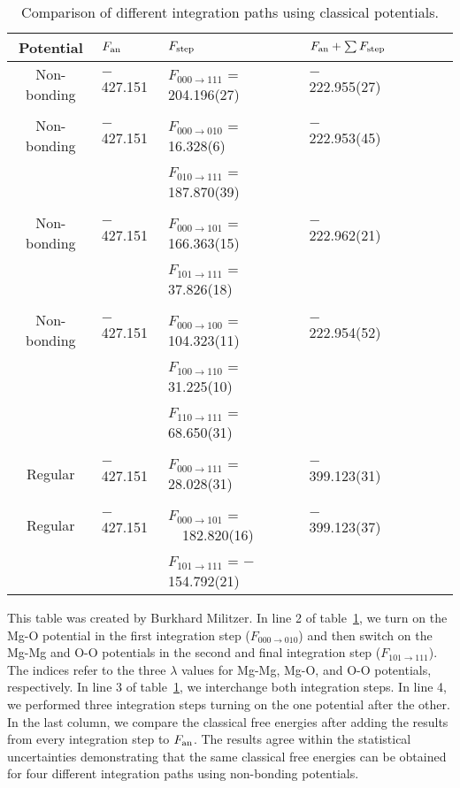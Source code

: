  \begin{table}[!h]
     \centering
\caption{Comparison of different integration paths using classical potentials. 
  \label{tab:compare_int_path}}

     \begin{tabular}{clllllll}
         \hline
{Potential} & 
            {$F_{\rm an}$} & 
            {$F_{\rm step}$} & 
            {$F_{\rm an} + \sum F_{\rm step}$} \\
         \hline
Non-bonding & $-$427.151 & $F_{000 \to 111}$ = 204.196(27)      & $-$222.955(27)
\\[1mm]\hline\\[-2.5mm]
Non-bonding & $-$427.151 & $F_{000 \to 010}$ = $\,\:$16.328(6)  & $-$222.953(45)\\
           &          & $F_{010 \to 111}$ = 187.870(39) 
\\[1mm]\hline\\[-2.5mm]
Non-bonding & $-$427.151 & $F_{000 \to 101}$ = 166.363(15)      & $-$222.962(21)\\
           &          & $F_{101 \to 111}$ = $\,\:$37.826(18)
\\[1mm]\hline\\[-2.5mm]
Non-bonding & $-$427.151 & $F_{000 \to 100}$ = 104.323(11)      & $-$222.954(52)\\
           &          & $F_{100 \to 110}$ = $\,\:$31.225(10) \\
           &          & $F_{110 \to 111}$ = $\,\:$68.650(31)
\\[1mm]\hline\\[-2.5mm]
Regular     & $-$427.151 & $F_{000 \to 111}$ = $\,\:$28.028(31) & $-$399.123(31) 
\\[1mm]\hline\\[-2.5mm]
Regular     & $-$427.151 & $F_{000 \to 101}$ = ~~182.820(16)      & $-$399.123(37) \\
           &          & $F_{101 \to 111}$ = $-$154.792(21) \\
\hline
\end{tabular}
\end{table}

This table was created by Burkhard Militzer. In line 2 of
table~\ref{tab:compare_int_path}, we turn on the Mg-O potential in the first
integration step ($F_{000 \to 010}$) and then switch on the Mg-Mg and O-O potentials
in the second and final integration step ($F_{101 \to 111}$). The indices refer to
the three $\lambda$ values for Mg-Mg, Mg-O, and O-O potentials, respectively. In line
3 of table~\ref{tab:compare_int_path}, we interchange both integration steps. In line
4, we performed three integration steps turning on the one potential after the other.
In the last column, we compare the classical free energies after adding the results
from every integration step to $F_{\rm an}$. The results agree within the statistical
uncertainties demonstrating that the same classical free energies can be obtained for
four different integration paths using non-bonding potentials.

